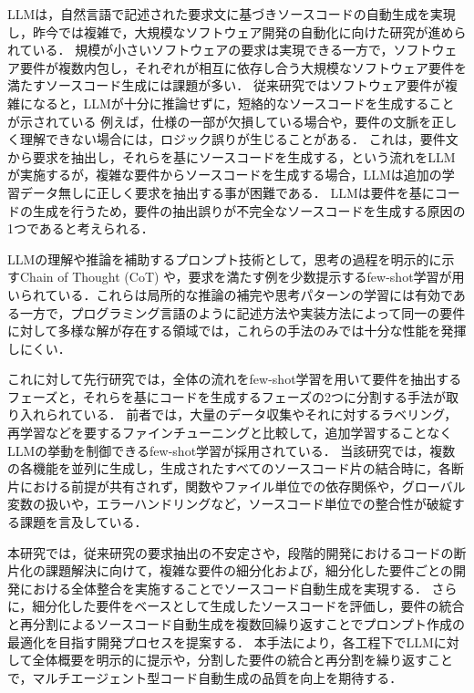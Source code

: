 \documentclass[submit,techrep,noauthor]{ipsj}
\begin{document}
LLMは，自然言語で記述された要求文に基づきソースコードの自動生成を実現し，昨今では複雑で，大規模なソフトウェア開発の自動化に向けた研究が進められている\cite{LLM_CodeGeneration}．
規模が小さいソフトウェアの要求は実現できる一方で，ソフトウェア要件が複数内包し，それぞれが相互に依存し合う大規模なソフトウェア要件を満たすソースコード生成には課題が多い．
従来研究ではソフトウェア要件が複雑になると，LLMが十分に推論せずに，短絡的なソースコードを生成することが示されている\cite{IllusionApple}
例えば，仕様の一部が欠損している場合や，要件の文脈を正しく理解できない場合には，ロジック誤りが生じることがある．
これは，要件文から要求を抽出し，それらを基にソースコードを生成する，という流れをLLMが実施するが，複雑な要件からソースコードを生成する場合，LLMは追加の学習データ無しに正しく要求を抽出する事が困難である．
LLMは要件を基にコードの生成を行うため，要件の抽出誤りが不完全なソースコードを生成する原因の1つであると考えられる．

LLMの理解や推論を補助するプロンプト技術として，思考の過程を明示的に示すChain of Thought (CoT) や，要求を満たす例を少数提示するfew-shot学習が用いられている\cite{LLM_fewshot}．これらは局所的な推論の補完や思考パターンの学習には有効である一方で，プログラミング言語のように記述方法や実装方法によって同一の要件に対して多様な解が存在する領域では，これらの手法のみでは十分な性能を発揮しにくい．

これに対して先行研究では，全体の流れをfew-shot学習を用いて要件を抽出するフェーズと，それらを基にコードを生成するフェーズの2つに分割する手法が取り入れられている\cite{tosem}．
前者では，大量のデータ収集やそれに対するラベリング，再学習などを要するファインチューニングと比較して，追加学習することなくLLMの挙動を制御できるfew-shot学習が採用されている．
当該研究では，複数の各機能を並列に生成し，生成されたすべてのソースコード片の結合時に，各断片における前提が共有されず，関数やファイル単位での依存関係や，グローバル変数の扱いや，エラーハンドリングなど，ソースコード単位での整合性が破綻する課題を言及している．


本研究では，従来研究\cite{tosem}の要求抽出の不安定さや，段階的開発におけるコードの断片化の課題解決に向けて，複雑な要件の細分化および，細分化した要件ごとの開発における全体整合を実施することでソースコード自動生成を実現する．
さらに，細分化した要件をベースとして生成したソースコードを評価し，要件の統合と再分割によるソースコード自動生成を複数回繰り返すことでプロンプト作成の最適化を目指す開発プロセスを提案する．
本手法により，各工程下でLLMに対して全体概要を明示的に提示や，分割した要件の統合と再分割を繰り返すことで，マルチエージェント型コード自動生成の品質を向上を期待する．
\end{document}
